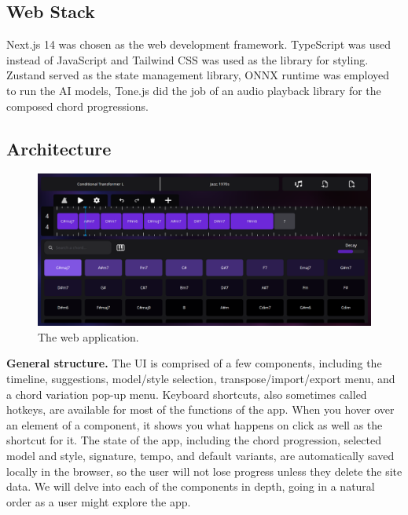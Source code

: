 \documentclass{article}
\begin{document}
\subsection{Web Stack}

Next.js 14 \cite{nextjs14.0.4} was chosen as the web development framework. TypeScript was used instead of JavaScript and Tailwind CSS \cite{tailwindcss3.3.6} was used as the library for styling. Zustand \cite{zustand4.4.7} served as the state management library, ONNX runtime \cite{onnxruntime1.16.3} was employed to run the AI models, Tone.js \cite{tonejs14.7.77} did the job of an audio playback library for the composed chord progressions.

\subsection{Architecture}

\begin{figure}[!htbp]
    \centering
    \includegraphics[width=1\linewidth]{images/app-screenshot.png}
    \caption{The web application.}
    \label{fig:app_screenshot}
\end{figure}

\textbf{General structure.} The UI is comprised of a few components, including the timeline, suggestions, model/style selection, transpose/import/export menu, and a chord variation pop-up menu. Keyboard shortcuts, also sometimes called hotkeys, are available for most of the functions of the app. When you hover over an element of a component, it shows you what happens on click as well as the shortcut for it. The state of the app, including the chord progression, selected model and style, signature, tempo, and default variants, are automatically saved locally in the browser, so the user will not lose progress unless they delete the site data. We will delve into each of the components in depth, going in a natural order as a user might explore the app.
\end{document}
